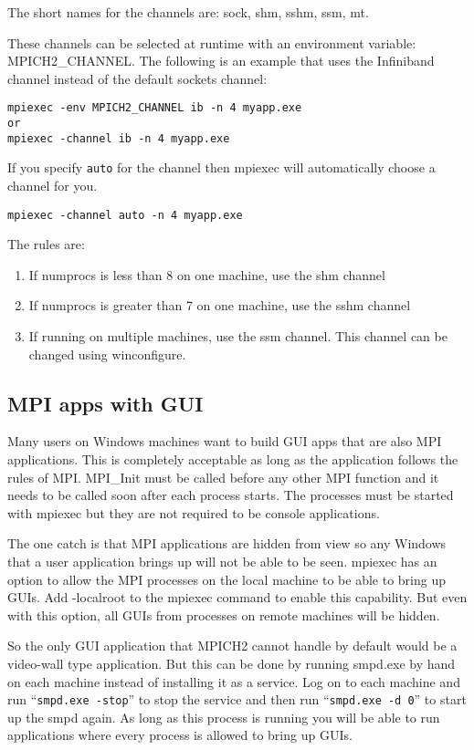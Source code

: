 \documentclass[dvipdfm,11pt]{article}
\begin{document}
The short names for the channels are: sock, shm, sshm, ssm, mt.

These channels can be selected at runtime with an environment variable: MPICH2\_CHANNEL.
The following is an example that uses the Infiniband channel instead of the default sockets
channel:

\begin{verbatim}
mpiexec -env MPICH2_CHANNEL ib -n 4 myapp.exe
or
mpiexec -channel ib -n 4 myapp.exe
\end{verbatim}

If you specify \texttt{auto} for the channel then mpiexec will automatically choose a
channel for you.
\begin{verbatim}
mpiexec -channel auto -n 4 myapp.exe
\end{verbatim}
The rules are:
\begin{enumerate}
\item If numprocs is less than 8 on one machine, use the shm channel
\item If numprocs is greater than 7 on one machine, use the sshm channel
\item If running on multiple machines, use the ssm channel.  This channel can be changed 
using winconfigure.
\end{enumerate}

\subsection{MPI apps with GUI}
Many users on Windows machines want to build GUI apps that are also MPI applications.  This is
completely acceptable as long as the application follows the rules of MPI.  MPI\_Init must be
called before any other MPI function and it needs to be called soon after each process starts.
The processes must be started with mpiexec but they are not required to be console applications.

The one catch is that MPI applications are hidden from view so any Windows that a user 
application brings up will not be able to be seen.  mpiexec has an option to allow the MPI 
processes on the local machine to be able to bring up GUIs.  Add -localroot to the mpiexec
command to enable this capability.  But even with this option, all GUIs from processes on 
remote machines will be hidden.

So the only GUI application that MPICH2 cannot handle by default would be a video-wall type
application.  But this can be done by running smpd.exe by hand on each machine instead of
installing it as a service.  Log on to each machine and run ``\texttt{smpd.exe -stop}'' 
to stop the service and then run ``\texttt{smpd.exe -d 0}'' to start up the smpd again.  
As long as this process is running you will be able to run applications where every process 
is allowed to bring up GUIs.
\end{document}
